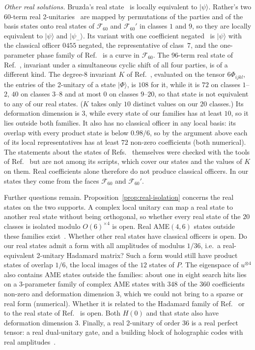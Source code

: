 \documentclass[aps,pra,reprint,superscriptaddress,amsmath,amssymb,longbibliography]{revtex4-2}
\newcommand{\ket}[1]{\lvert #1\rangle}
\theoremstyle{plain}
\begin{document}
\emph{Other real solutions.}  Bruzda's real state~\cite{Bru26} is locally equivalent to $\ket\psi$.  Rather's two
$60$-term real 2-unitaries~\cite{Rat26} are mapped by permutations of the parties and of the basis states onto real
states of $\mathcal F_{60}$ and $\mathcal F_{60}'$ in classes $1$ and $9$, so they are locally equivalent to
$\ket\psi$ and $\ket{\psi_-}$.  Its variant with
one coefficient negated~\cite{HZ26} is $\ket\psi$ with the classical officer $0455$ negated, the representative of
class~$7$, and the one-parameter phase family of Ref.~\cite{HZ26} is a curve in $\mathcal F_{60}$.  The 96-term real
state of Ref.~\cite{HZ26}, invariant under a simultaneous cyclic shift of all four parties, is of a different kind.
The degree-8 invariant $K$ of Ref.~\cite{HZ26}, evaluated on the tensor $6\Phi_{ijkl}$, the entries of the 2-unitary of a
state $\ket\Phi$, is $108$ for it, while it is $72$
on classes $1$--$2$, $40$ on classes $3$--$8$ and at most $0$ on classes $9$--$20$, so that state is not equivalent
to any of our real states.  ($K$ takes only $10$ distinct values on our $20$ classes.)  Its deformation dimension
is $3$, while every state of our families has at least $10$, so it lies outside both families.  It also has no
classical officer in any local basis: its overlap with every product state is below $0.98/6$, so by the
argument above each of its local representatives has at least $72$ non-zero coefficients (both numerical).  The
statements about the states of Refs.~\cite{Bru26,Rat26,HZ26} themselves were checked with the tools of Ref.~\cite{repo} but are
not among its scripts, which cover our states and the values of $K$ on them.  Real
coefficients alone therefore do not produce classical officers.  In our states they come from the faces $\mathcal F_{60}$ and $\mathcal F_{60}'$.

Further questions remain.  Proposition~\ref{prop:real-isolation} concerns the real states on the two supports.  A
complex local unitary can map a real state to another real state without being orthogonal, so whether every real state
of the $20$ classes is isolated modulo $O(6)^{\times4}$ is open.
Real AME$(4,6)$ states outside these families exist~\cite{HZ26}.  Whether other real states
have classical officers is open.  Do our real states admit a form with all amplitudes of modulus $1/36$, i.e.\ a
real-equivalent 2-unitary Hadamard matrix?  Such a form would still have product states of overlap $1/6$, the local
images of the $12$ states of $P$.
The eigenspace of $u^{\otimes4}$ also contains AME states
outside the families: about one in eight search hits lies on a $3$-parameter family of complex AME states with $348$
of the $360$ coefficients non-zero and deformation dimension $3$, which we could not bring to a sparse or real form
(numerical).  Whether it is related to the Hadamard family of Ref.~\cite{BZ24} or to the real state of
Ref.~\cite{HZ26} is open.  Both $H(0)$ and that state also have deformation dimension $3$.  Finally, a real 2-unitary of
order $36$ is a real perfect tensor: a real dual-unitary gate, and a building block of holographic codes with real
amplitudes~\cite{PYHP2015,BKP2019}.
\end{document}
